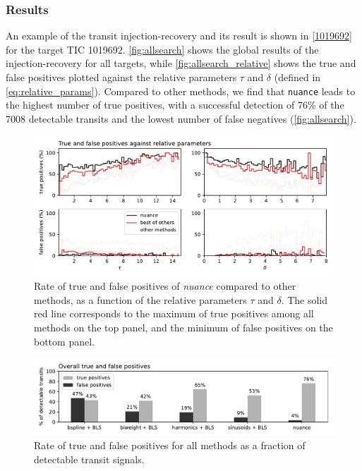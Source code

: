 \documentclass[modern]{aastex631}
\newcommand{\nuancemethod}{\textit{nuance}}
\newcommand{\nuance}{\nuancemethod{}}
\begin{document}
\newpage
\subsubsection*{Results}
An example of the transit injection-recovery and its result is shown in \autoref{1019692} for the target TIC 1019692. \autoref{fig:allsearch} shows the global results of the injection-recovery for all targets, while \autoref{fig:allsearch_relative} shows the true and false positives plotted against the relative parameters $\tau$ and $\delta$ (defined in \autoref{eq:relative_params}). Compared to other methods, we find that \texttt{nuance} leads to the highest number of true positives, with a successful detection of 76\% of the 7008 detectable transits and the lowest number of false negatives (\autoref{fig:allsearch}).
\begin{figure}[H]
    \begin{centering}
        \includegraphics[width=\linewidth]{../workflows/tess_injection_recovery/figures/true_false_positives.pdf}
        \caption{Rate of true and false positives of \nuance{} compared to other methods, as a function of the relative parameters $\tau$ and $\delta$. The solid red line corresponds to the maximum of true positives among all methods on the top panel, and the minimum of false positives on the bottom panel.}
        \label{fig:allsearch_relative}
    \end{centering}
\end{figure}
\begin{figure}[H]
    \begin{centering}
        \includegraphics[width=\linewidth]{../workflows/tess_injection_recovery/figures/true_and_false_positives_bars.pdf}
        \caption{Rate of true and false positives for all methods as a fraction of detectable transit signals.}
        \label{fig:allsearch}
    \end{centering}
\end{figure}
\end{document}
